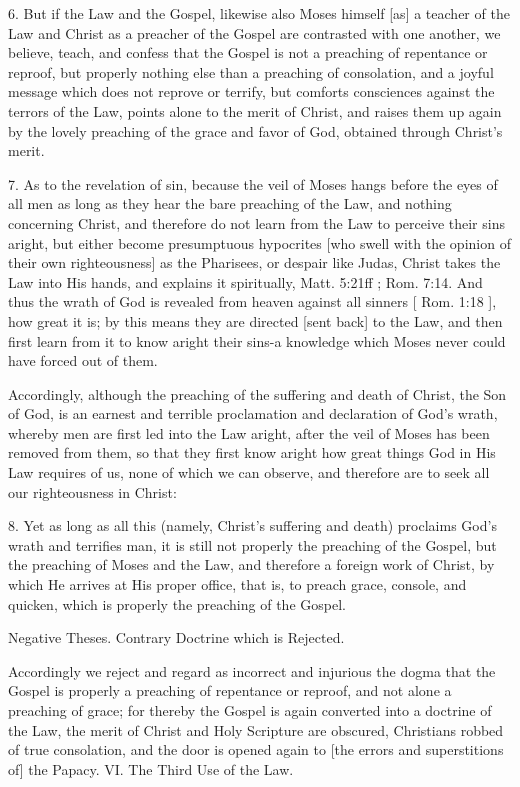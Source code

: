 6. But if the Law and the Gospel, likewise also Moses himself [as] a teacher of the Law and Christ as a preacher of the Gospel are contrasted with one another, we believe, teach, and confess that the Gospel is not a preaching of repentance or reproof, but properly nothing else than a preaching of consolation, and a joyful message which does not reprove or terrify, but comforts consciences against the terrors of the Law, points alone to the merit of Christ, and raises them up again by the lovely preaching of the grace and favor of God, obtained through Christ's merit.

7. As to the revelation of sin, because the veil of Moses hangs before the eyes of all men as long as they hear the bare preaching of the Law, and nothing concerning Christ, and therefore do not learn from the Law to perceive their sins aright, but either become presumptuous hypocrites [who swell with the opinion of their own righteousness] as the Pharisees, or despair like Judas, Christ takes the Law into His hands, and explains it spiritually, Matt. 5:21ff ; Rom. 7:14. And thus the wrath of God is revealed from heaven against all sinners [ Rom. 1:18 ], how great it is; by this means they are directed [sent back] to the Law, and then first learn from it to know aright their sins-a knowledge which Moses never could have forced out of them.

Accordingly, although the preaching of the suffering and death of Christ, the Son of God, is an earnest and terrible proclamation and declaration of God's wrath, whereby men are first led into the Law aright, after the veil of Moses has been removed from them, so that they first know aright how great things God in His Law requires of us, none of which we can observe, and therefore are to seek all our righteousness in Christ:

8. Yet as long as all this (namely, Christ's suffering and death) proclaims God's wrath and terrifies man, it is still not properly the preaching of the Gospel, but the preaching of Moses and the Law, and therefore a foreign work of Christ, by which He arrives at His proper office, that is, to preach grace, console, and quicken, which is properly the preaching of the Gospel.

Negative Theses.
Contrary Doctrine which is Rejected.

Accordingly we reject and regard as incorrect and injurious the dogma that the Gospel is properly a preaching of repentance or reproof, and not alone a preaching of grace; for thereby the Gospel is again converted into a doctrine of the Law, the merit of Christ and Holy Scripture are obscured, Christians robbed of true consolation, and the door is opened again to [the errors and superstitions of] the Papacy.
VI. The Third Use of the Law.

